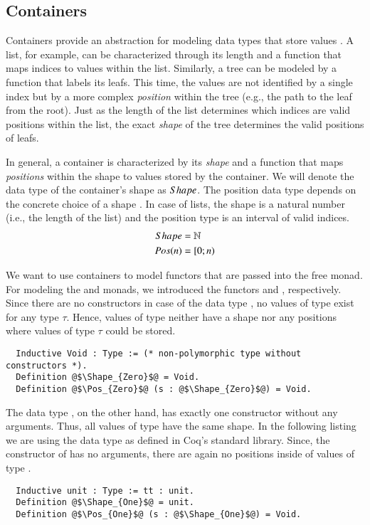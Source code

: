 \subsection{Containers}
\label{sec:preliminaries:modeling-effects:containers}
Containers provide an abstraction for modeling data types that store values \cite[p.~8]{Dylus:2018}.
A list, for example, can be characterized through its length and a function that maps indices to values within the list.
Similarly, a tree can be modeled by a function that labels its leafs.
This time, the values are not identified by a single index but by a more complex \textit{position} within the tree (e.g., the path to the leaf from the root).
Just as the length of the list determines which indices are valid positions within the list, the exact \textit{shape} of the tree determines the valid positions of leafs.

In general, a container is characterized by its \textit{shape} and a function that maps \textit{positions} within the shape to values stored by the container.
We will denote the data type of the container's shape as $Shape$.
The position data type  depends on the concrete choice of a shape .
In case of lists, the shape is a natural number (i.e., the length of the list) and the position type is an interval of valid indices.
\begin{align*}
  Shape &= \mathbb{N}
  \\
  Pos(n) &= [0; n)
\end{align*}

We want to use containers to model functors that are passed into the free monad.
For modeling the  and  monads, we introduced the functors  and , respectively.
Since there are no constructors in case of the data type , no values of type  exist for any type $\tau$.
Hence, values of type  neither have a shape nor any positions where values of type $\tau$ could be stored.
\begin{verbatim}
  Inductive Void : Type := (* non-polymorphic type without constructors *).
  Definition @$\Shape_{Zero}$@ = Void.
  Definition @$\Pos_{Zero}$@ (s : @$\Shape_{Zero}$@) = Void.
\end{verbatim}
The data type , on the other hand, has exactly one constructor without any arguments.
Thus, all values of type  have the same shape.
In the following listing we are using the  data type as defined in Coq's standard library.
Since, the constructor of  has no arguments, there are again no positions inside of values of type .
\begin{verbatim}
  Inductive unit : Type := tt : unit.
  Definition @$\Shape_{One}$@ = unit.
  Definition @$\Pos_{One}$@ (s : @$\Shape_{One}$@) = Void.
\end{verbatim}


